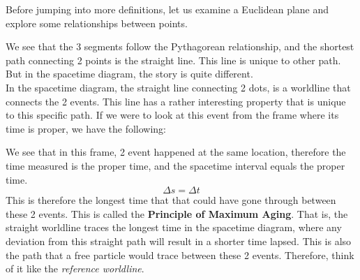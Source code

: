 \documentclass[12pt]{book}
\begin{document}
\begin{center}
\end{center}
Before jumping into more definitions, let us examine a Euclidean plane and explore some relationships between points.
\begin{center}
\end{center}
We see that the 3 segments follow the Pythagorean relationship, and the shortest path connecting 2 points is the straight line. This line is unique to other path. But in the spacetime diagram, the story is quite different. \\
\newline
In the spacetime diagram, the straight line connecting 2 dots, is a worldline that connects the 2 events. This line has a rather interesting property that is unique to this specific path. If we were to look at this event from the frame where its time is proper, we have the following:
\begin{center}
\end{center}
We see that in this frame, 2 event happened at the same location, therefore the time measured is the proper time, and the spacetime interval equals the proper time.
\[
\Delta s = \Delta t
\]
This is therefore the longest time that that could have gone through between these 2 events. This is called the \textbf{Principle of Maximum Aging}. That is, the straight worldline traces the longest time in the spacetime diagram, where any deviation from this straight path will result in a shorter time lapsed. This is also the path that a free particle would trace between these 2 events. Therefore, think of it like the \textit{reference worldline}.\\
\end{document}
